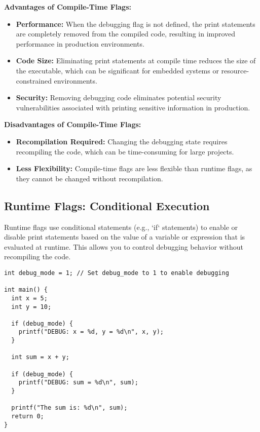\documentclass{article}
\begin{document}
{{{\textbf{Advantages of Compile-Time Flags:}

\begin{itemize}
    \item \textbf{Performance:} When the debugging flag is not defined, the print statements are completely removed from the compiled code, resulting in improved performance in production environments.
    \item \textbf{Code Size:} Eliminating print statements at compile time reduces the size of the executable, which can be significant for embedded systems or resource-constrained environments.
    \item \textbf{Security:} Removing debugging code eliminates potential security vulnerabilities associated with printing sensitive information in production.
\end{itemize}

\textbf{Disadvantages of Compile-Time Flags:}

\begin{itemize}
    \item \textbf{Recompilation Required:} Changing the debugging state requires recompiling the code, which can be time-consuming for large projects.
    \item \textbf{Less Flexibility:} Compile-time flags are less flexible than runtime flags, as they cannot be changed without recompilation.
\end{itemize}

\subsection*{Runtime Flags: Conditional Execution}

Runtime flags use conditional statements (e.g., `if` statements) to enable or disable print statements based on the value of a variable or expression that is evaluated at runtime. This allows you to control debugging behavior without recompiling the code.

\begin{verbatim}
int debug_mode = 1; // Set debug_mode to 1 to enable debugging

int main() {
  int x = 5;
  int y = 10;

  if (debug_mode) {
    printf("DEBUG: x = %d, y = %d\n", x, y);
  }

  int sum = x + y;

  if (debug_mode) {
    printf("DEBUG: sum = %d\n", sum);
  }

  printf("The sum is: %d\n", sum);
  return 0;
}
\end{verbatim}

}}}
\end{document}
